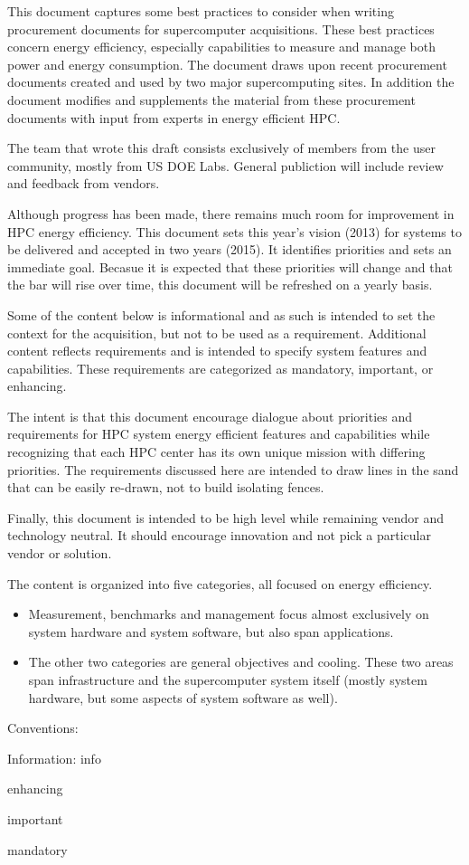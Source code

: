 This document captures some best practices to consider when writing procurement documents for supercomputer acquisitions. These best practices concern energy efficiency, especially capabilities to measure and manage both power and energy consumption. The document draws upon recent procurement documents created and used by two major supercomputing sites. In addition the document modifies and supplements the material from these procurement documents with input from experts in energy efficient HPC.
 
The team that wrote this draft consists exclusively of members from the user community, mostly from US DOE Labs.  General publiction will include review and feedback from vendors.

Although  progress has been made, there remains much room for improvement in HPC energy efficiency. This document sets this year's vision (2013) for systems to be delivered and accepted in two years (2015). It identifies priorities and sets an immediate goal.  Becasue it is expected that these priorities will change and that the bar will rise over time, this document will be refreshed on a yearly basis.

Some of the content below is informational and as such is intended to set the context for the acquisition, but not to be used as a requirement.  Additional content reflects requirements and is intended to specify system features and capabilities.  These requirements are categorized as mandatory, important, or enhancing.

The intent is that this document encourage dialogue about priorities and requirements for HPC system energy efficient features and capabilities while recognizing that each HPC center has its own unique mission with differing priorities. The requirements discussed here are intended to draw lines in the sand that can be easily re-drawn, not to build isolating fences.
 
Finally, this document is intended to be high level while remaining vendor and technology neutral.  It should encourage innovation and not pick a particular vendor or solution.

The content is organized into five categories, all focused on energy efficiency.  

\begin{itemize}
\item
Measurement, benchmarks and management focus almost exclusively on system hardware and system software, but also span applications.  
\item
The other two categories are general objectives and cooling.  These two areas span infrastructure and the supercomputer system itself (mostly system hardware, but some aspects of system software as well).
\end{itemize}

Conventions:

Information: info

\begin{packed_enum}
\item
enhancing
\item
important
\item
mandatory
\end{packed_enum}
